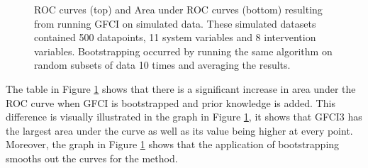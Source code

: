 \documentclass[a4paper,pdf]{article}
\begin{document}
\begin{figure}[!ht]
    \centering   
    \renewcommand{\arraystretch}{2}
    \setlength{\tabcolsep}{7pt}
    \caption{ROC curves (top) and Area under ROC curves (bottom) resulting from running GFCI on simulated data. These simulated datasets contained 500 datapoints, 11 system variables and 8 intervention variables. Bootstrapping occurred by running the same algorithm on random subsets of data 10 times and averaging the results. \label{fig:simgraphgfci}}
\end{figure}

\newpage %
The table in Figure \ref{fig:simgraphgfci} shows that there is a significant increase in area under the ROC curve when GFCI is bootstrapped and prior knowledge is added. This difference is visually illustrated in the graph in Figure \ref{fig:simgraphgfci}, it shows that GFCI3 has the largest area under the curve as well as its value being higher at every point. Moreover, the graph in Figure \ref{fig:simgraphgfci} shows that the application of bootstrapping smooths out the curves for the method. 
\end{document}
